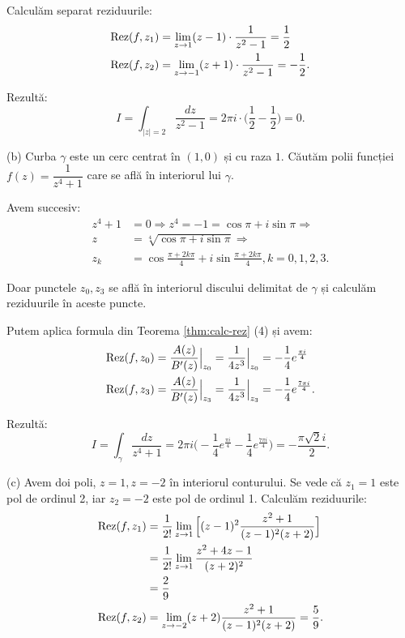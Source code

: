 Calculăm separat reziduurile:
\begin{align*}
  \mathrm{Rez}(f, z_1) &= \lim_{z \to 1} (z - 1) \cdot \frac{1}{z^2 - 1} = \frac{1}{2} \\
  \mathrm{Rez}(f, z_2) &= \lim_{z \to -1} (z + 1) \cdot \frac{1}{z^2 - 1} = -\frac{1}{2}.
\end{align*}

Rezultă:
\[
  I = \int_{|z| = 2} \frac{dz}{z^2 - 1} = 2 \pi i \cdot \Big( \frac{1}{2} - \frac{1}{2} \Big) = 0.
\]

\vspace{1cm}

(b) Curba $ \gamma $ este un cerc centrat în $ (1, 0) $ și cu raza $ 1 $. Căutăm
polii funcției $ f(z) = \dfrac{1}{z^4 + 1} $ care se află în interiorul lui $ \gamma $.

Avem succesiv:
\begin{align*}
  z^4 + 1 &= 0 \Rightarrow z^4 = -1 = \cos \pi + i \sin \pi \Rightarrow \\
  z &= \sqrt[4]{\cos \pi + i \sin \pi} \Rightarrow \\
  z_k &= \cos \frac{\pi + 2k\pi}{4} + i \sin \frac{\pi + 2k\pi}{4}, k = 0, 1, 2, 3.
\end{align*}

Doar punctele $ z_0, z_3 $ se află în interiorul discului delimitat de $ \gamma $
și calculăm reziduurile în aceste puncte.

Putem aplica formula din Teorema \ref{thm:calc-rez} (4) și avem:
\begin{align*}
  \Rez(f, z_0) &= \frac{A(z)}{B'(z)}\Big|_{z_0} = \frac{1}{4z^3}\Big|_{z_0} %
                 = -\frac{1}{4} e^{\frac{\pi i}{4}} \\
  \Rez(f, z_3) &= \frac{A(z)}{B'(z)}\Big|_{z_3} = \frac{1}{4z^3}\Big|_{z_3} %
                 = - \frac{1}{4} e^{\frac{7 \pi i}{4}}.
\end{align*}

Rezultă:
\[
  I = \int_\gamma \frac{dz}{z^4 + 1} = %
  2 \pi i \Big( -\frac{1}{4} e^{\frac{\pi i}{4}} - \frac{1}{4} e^{\frac{7 \pi i}{4}} \Big) = %
  -\frac{\pi \sqrt{2} i}{2}.
\]

\vspace{1cm}

(c) Avem doi poli, $ z = 1, z = -2 $ în interiorul conturului. Se vede că $ z_1 = 1 $
este pol de ordinul 2, iar $ z_2 = -2 $ este pol de ordinul 1. Calculăm reziduurile:
\begin{align*}
  \mathrm{Rez}(f, z_1) &= \frac{1}{2!} \lim_{z \to 1} \Big[ (z - 1)^2 \frac{z^2 + 1}{(z - 1)^2(z + 2)} \Big] \\
               &= \frac{1}{2!} \lim_{z \to 1} \frac{z^2 + 4z - 1}{(z + 2)^2} \\
               &= \frac{2}{9} \\
  \mathrm{Rez}(f, z_2) &= \lim_{z \to -2} (z + 2) \frac{z^2 + 1}{(z - 1)^2(z + 2)} = \frac{5}{9}.
\end{align*}

